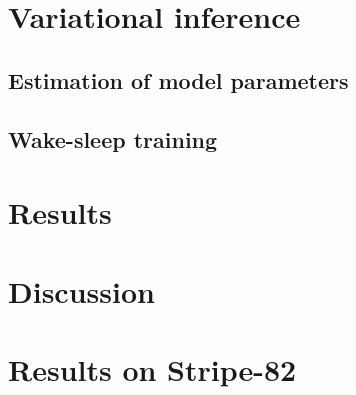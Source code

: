 \documentclass[12pt]{article}
\begin{document}
\section{Variational inference}
\label{sec:var_inference}


\subsection{Estimation of model parameters}
\label{sec:model_params}


\subsection{Wake-sleep training}
\label{sec:wake_sleep}


% 

\section{Results}
\label{sec:results}



\section{Discussion}
\label{sec:discussion}





\appendix
\section{Results on Stripe-82}

\end{document}
